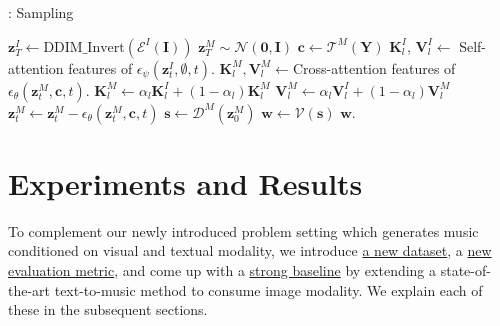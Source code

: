 \begin{algorithm}[!t]
\small
\caption{\modelname: Sampling}
\label{algo:sampling}
\begin{algorithmic}[1]
\State $\bm{z}^{I}_{T} \leftarrow \text{DDIM\_Invert}(\mathcal{E}^I(\bm{I}))$ 
\State $\bm{z}^{M}_{T} \sim \mathcal{N}(\bm{0}, \textbf{I})$ 
\State $\bm{c} \leftarrow \mathcal{T}^M(\bm{Y})$ 
 
\State $\bm{K}^I_l$, $\bm{V}^I_l \leftarrow$ Self-attention features of $\epsilon_\psi(\bm{z}^{I}_{t},\emptyset, t)$.
\State $\bm{K}^M_l,\bm{V}^M_l\leftarrow$Cross-attention features of $\epsilon_\theta(\bm{z}^{M}_{t},\bm{c},t)$.
\State $\bm{K}^M_l \leftarrow \alpha_l \bm{K}^I_l + (1 - \alpha_l) \bm{K}^M_l$  
\State $\bm{V}^M_l \leftarrow \alpha_l \bm{V}^I_l + (1 - \alpha_l) \bm{V}^M_l$  
\EndFor
\State $\bm{z}^{M}_{t} \leftarrow \bm{z}^{M}_{t} - \epsilon_\theta(\bm{z}^{M}_{t},\bm{c},t)$ 
\EndFor
\State $\bm{s} \leftarrow \mathcal{D}^M(\bm{z}^{M}_{0})$ 
\State $\bm{w} \leftarrow \mathcal{V}(\bm{s})$ 
\State \Return $\bm{w}$.
\end{algorithmic}
\end{algorithm}

 

\section{Experiments and Results}
\label{experiments_and_results}
To complement our newly introduced problem setting which generates music conditioned on visual and textual modality, we introduce \underline{a new dataset}, a \underline{new evaluation metric}, and come up with a \underline{strong baseline} by extending a state-of-the-art text-to-music method to consume image modality. We explain each of these in the subsequent sections.


